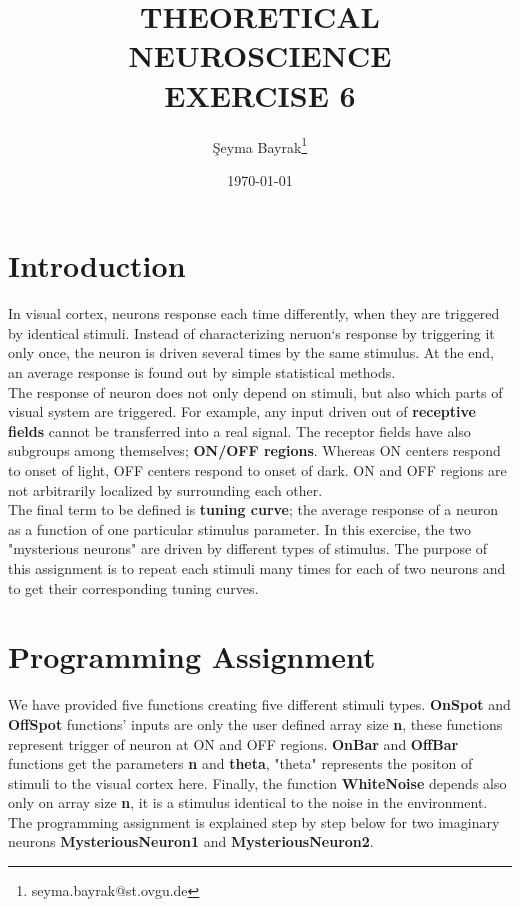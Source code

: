 \documentclass{article}
\begin{document}
\title{THEORETICAL NEUROSCIENCE \\ EXERCISE 6}
\date{\today}
\author[1]{\c{S}eyma Bayrak\thanks{seyma.bayrak@st.ovgu.de}}
\maketitle

\section{Introduction}

In visual cortex, neurons response each time differently, when they are triggered by identical stimuli. Instead of characterizing neruon`s response by triggering it only once, the neuron is driven several times by the same stimulus. At the end, an average response is found out by simple statistical methods.\\

The response of neuron does not only depend on stimuli, but also which parts of visual system are triggered. For example, any input driven out of \textbf{receptive fields} cannot be transferred into a real signal. The receptor fields have also subgroups among themselves; \textbf{ON/OFF regions}. Whereas ON centers respond to onset of light, OFF centers respond to onset of dark. ON and OFF regions are not arbitrarily localized by surrounding each other.\\ 

The final term to be defined is \textbf{tuning curve}; the average response of a neuron as a function of one particular stimulus parameter. In this exercise, the two "mysterious neurons" are driven by different types of stimulus. The purpose of this assignment is to repeat each stimuli many times for each of two neurons and to get their corresponding tuning curves.

\section{Programming Assignment}

We have provided five functions creating five different stimuli types. \textbf{OnSpot} and \textbf{OffSpot} functions' inputs are only the user defined array size \textbf{n}, these functions represent trigger of neuron at ON and OFF regions. \textbf{OnBar} and \textbf{OffBar} functions get the parameters \textbf{n} and \textbf{theta}, "theta" represents the positon of stimuli to the visual cortex here. Finally, the function \textbf{WhiteNoise} depends also only on array size \textbf{n}, it is a stimulus identical to the noise in the environment. The programming assignment is explained step by step below for two imaginary neurons \textbf{MysteriousNeuron1} and \textbf{MysteriousNeuron2}. \\ 
\end{document}
